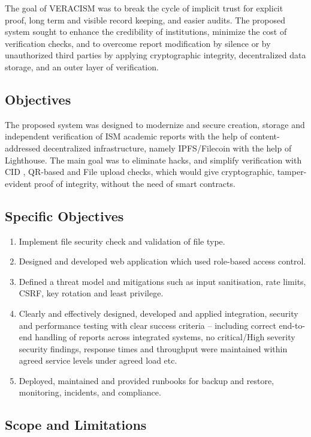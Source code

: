 The goal of VERACISM was to break the cycle of implicit trust for explicit proof, long term and visible record keeping, and easier audits. The proposed system sought to enhance the credibility of institutions, minimize the cost of verification checks, and to overcome report modification by silence or by unauthorized third parties by applying cryptographic integrity, decentralized data storage, and an outer layer of verification.

    \subsection{Objectives}

The proposed system was designed to modernize and secure creation, storage and independent verification of ISM academic reports with the help of content-addressed decentralized infrastructure, namely IPFS/Filecoin with the help of Lighthouse. The main goal was to eliminate hacks, and simplify verification with CID , QR-based and File upload checks, which would give cryptographic, tamper-evident proof of integrity, without the need of smart contracts.

    \subsection{Specific Objectives}
\begin{enumerate}
  \item Implement file security check and validation of file type.
  \item Designed and developed web application which used role-based access control.
  \item Defined a threat model and mitigations such as input sanitisation, rate limits, CSRF, key rotation and least privilege.
  \item Clearly and effectively designed, developed and applied integration, security and performance testing with clear success criteria – including correct end-to-end handling of reports across integrated systems, no critical/High severity security findings, response times and throughput were maintained within agreed service levels under agreed load etc.
  \item Deployed, maintained and provided runbooks for backup and restore, monitoring, incidents, and compliance.
\end{enumerate}

    \subsection{Scope and Limitations}

